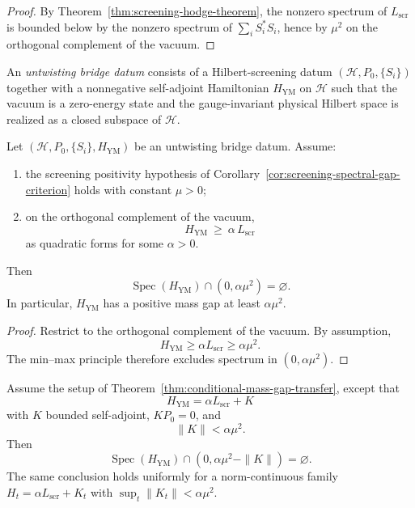 \begin{proof}
By Theorem~\ref{thm:screening-hodge-theorem}, the nonzero spectrum of $L_{\mathrm{scr}}$ is bounded below by the
nonzero spectrum of $\sum_i S_i^*S_i$, hence by $\mu^2$ on the orthogonal complement of the vacuum.
\end{proof}

\begin{definition}
\label{def:untwisting-bridge-datum}
An \emph{untwisting bridge datum} consists of a Hilbert-screening datum $(\mathcal H,P_0,\{S_i\})$
together with a nonnegative self-adjoint Hamiltonian $H_{\mathrm{YM}}$ on $\mathcal H$ such that the vacuum
is a zero-energy state and the gauge-invariant physical Hilbert space is realized as a closed subspace of $\mathcal H$.
\end{definition}

\begin{theorem}
\label{thm:conditional-mass-gap-transfer}
Let $(\mathcal H,P_0,\{S_i\},H_{\mathrm{YM}})$ be an untwisting bridge datum.
Assume:
\begin{enumerate}[label=(\alph*)]
\item the screening positivity hypothesis of Corollary~\ref{cor:screening-spectral-gap-criterion} holds with constant $\mu>0$;
\item on the orthogonal complement of the vacuum,
\[
H_{\mathrm{YM}}\ \ge\ \alpha\, L_{\mathrm{scr}}
\]
as quadratic forms for some $\alpha>0$.
\end{enumerate}
Then
\[
\operatorname{Spec}(H_{\mathrm{YM}})\cap (0,\alpha\mu^2)=\varnothing.
\]
In particular, $H_{\mathrm{YM}}$ has a positive mass gap at least $\alpha\mu^2$.
\end{theorem}

\begin{proof}
Restrict to the orthogonal complement of the vacuum.  By assumption,
\[
H_{\mathrm{YM}}\ge \alpha L_{\mathrm{scr}} \ge \alpha\mu^2.
\]
The min--max principle therefore excludes spectrum in $(0,\alpha\mu^2)$.
\end{proof}

\begin{corollary}
\label{cor:stable-untwisting-bounded-error}
Assume the setup of Theorem~\ref{thm:conditional-mass-gap-transfer}, except that
\[
H_{\mathrm{YM}} = \alpha L_{\mathrm{scr}} + K
\]
with $K$ bounded self-adjoint, $KP_0=0$, and
\[
\|K\|<\alpha\mu^2.
\]
Then
\[
\operatorname{Spec}(H_{\mathrm{YM}})\cap (0,\alpha\mu^2-\|K\|)=\varnothing.
\]
The same conclusion holds uniformly for a norm-continuous family $H_t=\alpha L_{\mathrm{scr}}+K_t$ with
$\sup_t\|K_t\|<\alpha\mu^2$.
\end{corollary}

